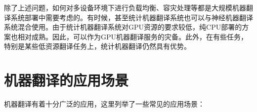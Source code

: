 \parinterval 除了上述问题，如何对多设备环境下进行负载均衡、容灾处理等都是大规模机器翻译系统部署中需要考虑的。有时候，甚至统计机器翻译系统也可以与神经机器翻译系统混合使用。由于统计机器翻译系统对GPU资源的要求较低，纯CPU部署的方案也相对成熟。因此，可以作为GPU机器翻译服务的灾备。此外，在有些任务，特别是某些低资源翻译任务上，统计机器翻译仍然具有优势。

\sectionnewpage
\section{机器翻译的应用场景}

\parinterval 机器翻译有着十分广泛的应用，这里列举了一些常见的应用场景：
